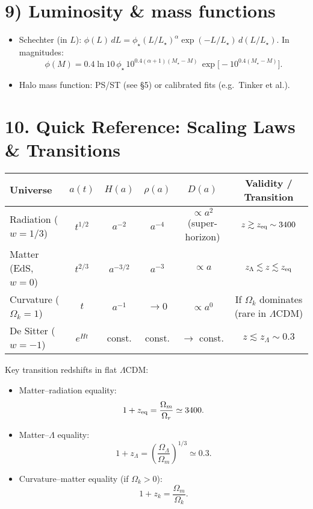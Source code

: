 \documentclass[11pt,a4paper]{article}
\begin{document}
\section*{9) Luminosity \& mass functions}
\begin{itemize}
\item Schechter (in $L$): 
$\phi(L)\,dL=\phi_\star (L/L_\star)^\alpha \exp(-L/L_\star)\,d(L/L_\star)$.
In magnitudes:
\[
\phi(M)=0.4\ln10\,\phi_\star\,10^{0.4(\alpha+1)(M_\star-M)}\,
\exp\!\big[-10^{0.4(M_\star-M)}\big].
\]
\item Halo mass function: PS/ST (see \S5) or calibrated fits (e.g.\ Tinker et al.).
\end{itemize}
\section*{10. Quick Reference: Scaling Laws \& Transitions}

\begin{center}
\begin{tabular}{lccccc}
\toprule
Universe & $a(t)$ & $H(a)$ & $\rho(a)$ & $D(a)$ & Validity / Transition \\
\midrule
Radiation ($w=1/3$) 
  & $t^{1/2}$ 
  & $a^{-2}$ 
  & $a^{-4}$ 
  & $\propto a^2$ (super-horizon) 
  & $z \gtrsim z_{\rm eq} \sim 3400$ \\
Matter (EdS, $w=0$) 
  & $t^{2/3}$ 
  & $a^{-3/2}$ 
  & $a^{-3}$ 
  & $\propto a$ 
  & $z_{\Lambda} \lesssim z \lesssim z_{\rm eq}$ \\
Curvature ($\Omega_k=1$) 
  & $t$ 
  & $a^{-1}$ 
  & $\to 0$ 
  & $\propto a^0$ 
  & If $\Omega_k$ dominates (rare in $\Lambda$CDM) \\
De Sitter ($w=-1$) 
  & $e^{Ht}$ 
  & const. 
  & const. 
  & $\to$ const. 
  & $z \lesssim z_{\Lambda} \sim 0.3$ \\
\bottomrule
\end{tabular}
\end{center}

\vspace{0.5em}
Key transition redshifts in flat $\Lambda$CDM:
\begin{itemize}
  \item Matter--radiation equality: 
  \[
  1+z_{\rm eq} = \frac{\Omega_m}{\Omega_r} \simeq 3400.
  \]
  \item Matter--$\Lambda$ equality:
  \[
  1+z_\Lambda = \left(\frac{\Omega_\Lambda}{\Omega_m}\right)^{1/3} \simeq 0.3.
  \]
  \item Curvature--matter equality (if $\Omega_k>0$): 
  \[
  1+z_k = \frac{\Omega_m}{\Omega_k}.
  \]
\end{itemize}
\end{document}
